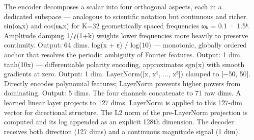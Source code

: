 {}\markdownRendererThematicBreak{}\markdownRendererInterblockSeparator
{}
\markdownRendererSectionEnd 
\markdownRendererSectionEnd \markdownRendererSectionBegin
{}\markdownRendererInterblockSeparator
{}\markdownRendererSectionBegin
{}\markdownRendererInterblockSeparator
{}The encoder decomposes a scalar into four orthogonal aspects, each in a dedicated subspace — analogous to scientific notation but continuous and richer.\markdownRendererInterblockSeparator
{}
\markdownRendererSectionEnd \markdownRendererSectionBegin
{}\markdownRendererInterblockSeparator
{}sin(ωₖx) and cos(ωₖx) for K=32 geometrically spaced frequencies ωₖ = 0.1 · 1.5ᵏ. Amplitude damping 1/√(1+k) weights lower frequencies more heavily to preserve continuity. Output: 64 dims.\markdownRendererInterblockSeparator
{}
\markdownRendererSectionEnd \markdownRendererSectionBegin
{}\markdownRendererInterblockSeparator
{}log(\markdownRendererPipe{}x\markdownRendererPipe{} + ε) / log(10) — monotonic, globally ordered anchor that resolves the periodic ambiguity of Fourier features. Output: 1 dim.\markdownRendererInterblockSeparator
{}
\markdownRendererSectionEnd \markdownRendererSectionBegin
{}\markdownRendererInterblockSeparator
{}tanh(10x) — differentiable polarity encoding, approximates sgn(x) with smooth gradients at zero. Output: 1 dim.\markdownRendererInterblockSeparator
{}
\markdownRendererSectionEnd \markdownRendererSectionBegin
{}\markdownRendererInterblockSeparator
{}LayerNorm([x, x², ..., x⁵]) clamped to [−50, 50]. Directly encodes polynomial features; LayerNorm prevents higher powers from dominating. Output: 5 dims.\markdownRendererInterblockSeparator
{}
\markdownRendererSectionEnd \markdownRendererSectionBegin
{}\markdownRendererInterblockSeparator
{}The four channels concatenate to 71 raw dims. A learned linear layer projects to 127 dims. LayerNorm is applied to this 127-dim vector for directional structure. The L2 norm of the pre-LayerNorm projection is computed and its log appended as an explicit 128th dimension. The decoder receives both direction (127 dims) and a continuous magnitude signal (1 dim).\markdownRendererInterblockSeparator
{}\markdownRendererInterblockSeparator
